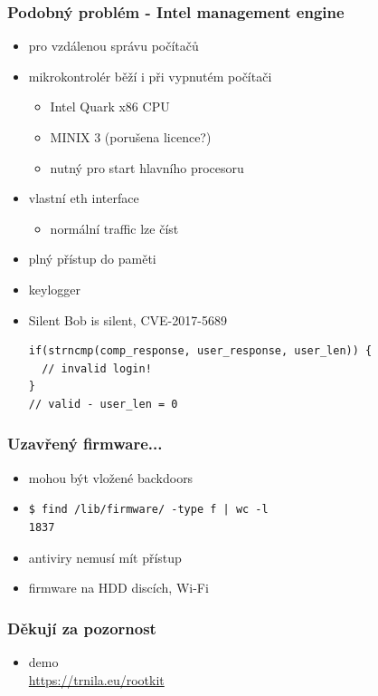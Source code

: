 \documentclass{beamer}
\begin{document}
\begin{frame}[fragile]
\frametitle{Podobný problém - Intel management engine}
\begin{itemize}
	\item pro vzdálenou správu počítačů
	\item mikrokontrolér běží i při vypnutém počítači
	\begin{itemize}
		\item Intel Quark x86 CPU
		\item MINIX 3 (porušena licence?)
		\item nutný pro start hlavního procesoru
	\end{itemize}

	\item vlastní eth interface
		\begin{itemize}
			\item normální traffic lze číst
		\end{itemize}
	
	\item plný přístup do paměti
	\item keylogger
	\item Silent Bob is silent, CVE-2017-5689
\begin{verbatim}
if(strncmp(comp_response, user_response, user_len)) {
  // invalid login!
}
// valid - user_len = 0
\end{verbatim}
\end{itemize}
\end{frame}

\begin{frame}[fragile]
\frametitle{Uzavřený firmware...}
\begin{itemize}
	\item mohou být vložené backdoors
	\item \begin{verbatim}
$ find /lib/firmware/ -type f | wc -l
1837
\end{verbatim}
	\item antiviry nemusí mít přístup
	\item firmware na HDD discích, Wi-Fi

\end{itemize}
\end{frame}

\begin{frame}[fragile]
\frametitle{Děkují za pozornost}
\begin{itemize}
	\item demo \\ \url{https://trnila.eu/rootkit}
	
\end{itemize}
\end{frame}


 
\end{document}
